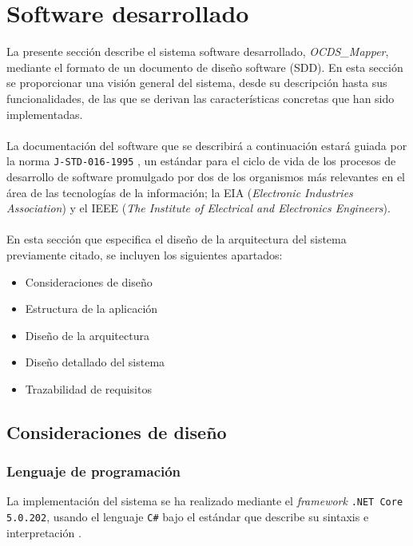 \section{Software desarrollado} \label{sec:software}
    La presente sección describe el sistema software desarrollado, \textit{OCDS\_Mapper}, mediante el formato de un documento de diseño software (SDD). En esta sección se proporcionar una visión general del sistema, desde su descripción hasta sus funcionalidades, de las que se derivan las características concretas que han sido implementadas.
    \\ \\
    La documentación del software que se describirá a continuación estará guiada por la norma \texttt{J-STD-016-1995} \cite{JSTD}, un estándar para el ciclo de vida de los procesos de desarrollo de software promulgado por dos de los organismos más relevantes en el área de las tecnologías de la información; la EIA (\textit{Electronic Industries Association}) y el IEEE (\textit{The Institute of Electrical and Electronics Engineers}).
    \\ \\
    En esta sección que especifica el diseño de la arquitectura del sistema previamente citado, se incluyen los siguientes apartados:
    \\
    \begin{itemize}
        \item Consideraciones de diseño
        \item Estructura de la aplicación
        \item Diseño de la arquitectura
        \item Diseño detallado del sistema
        \item Trazabilidad de requisitos
    \end{itemize}
    
    \subsection{Consideraciones de diseño}
        \subsubsection{Lenguaje de programación}
            La implementación del sistema se ha realizado mediante el \textit{framework} \texttt{.NET Core 5.0.202}, usando el lenguaje \texttt{C\#} bajo el estándar que describe su sintaxis e interpretación \cite{ISOCS}.
            
